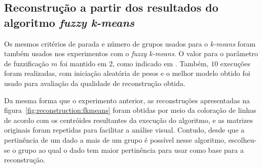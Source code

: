 \documentclass[
    12pt,                %
    oneside,            %
    a4paper,            %
    english,            %
    brazil                %
    ]{abntex2ppgsi}
\begin{document}
\subsection{Reconstrução a partir dos resultados do algoritmo \textit{fuzzy k-means}}
\label{subsec:results-reconstruction-fkmeans}

Os mesmos critérios de parada e número de grupos usados para o \textit{k-means} foram também usados nos experimentos com o \textit{fuzzy k-means}. O valor para o parâmetro de fuzzificação $m$ foi mantido em $2$, como indicado em \cite{Peres2012}. Também, $10$ execuções foram realizadas, com iniciação aleatória de pesos e o melhor modelo obtido foi usado para avaliação da qualidade de reconstrução obtida.


Da mesma forma que o experimento anterior, as reconstruções apresentadas na figura~\ref{fig:reconstruction:fkmeans} foram obtidas por meio da coloração de linhas de acordo com os centróides resultantes da execução do algoritmo, e as matrizes originais foram repetidas para facilitar a análise visual. Contudo, desde que a pertinência de um dado a mais de um grupo é possível nesse algoritmo, escolheu-se o grupo ao qual o dado tem maior pertinência para usar como base para a reconstrução. 
\end{document}
